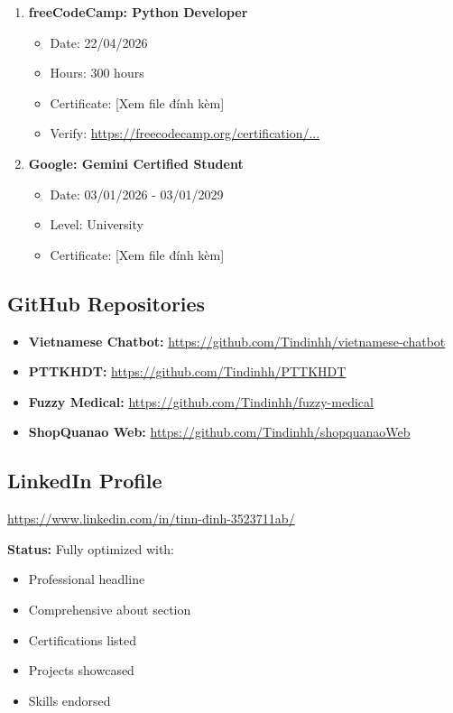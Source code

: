 \documentclass[12pt,a4paper]{article}
\begin{document}
\begin{enumerate}
    \item \textbf{freeCodeCamp: Python Developer}
    \begin{itemize}
        \item Date: 22/04/2026
        \item Hours: 300 hours
        \item Certificate: [Xem file đính kèm]
        \item Verify: \url{https://freecodecamp.org/certification/...}
    \end{itemize}

    \item \textbf{Google: Gemini Certified Student}
    \begin{itemize}
        \item Date: 03/01/2026 - 03/01/2029
        \item Level: University
        \item Certificate: [Xem file đính kèm]
    \end{itemize}
\end{enumerate}

\subsection{GitHub Repositories}

\begin{itemize}
    \item \textbf{Vietnamese Chatbot:} \url{https://github.com/Tindinhh/vietnamese-chatbot}
    \item \textbf{PTTKHDT:} \url{https://github.com/Tindinhh/PTTKHDT}
    \item \textbf{Fuzzy Medical:} \url{https://github.com/Tindinhh/fuzzy-medical}
    \item \textbf{ShopQuanao Web:} \url{https://github.com/Tindinhh/shopquanaoWeb}
\end{itemize}

\subsection{LinkedIn Profile}

\url{https://www.linkedin.com/in/tinn-đinh-3523711ab/}

\textbf{Status:} Fully optimized with:
\begin{itemize}
    \item Professional headline
    \item Comprehensive about section
    \item Certifications listed
    \item Projects showcased
    \item Skills endorsed
\end{itemize}
\end{document}
